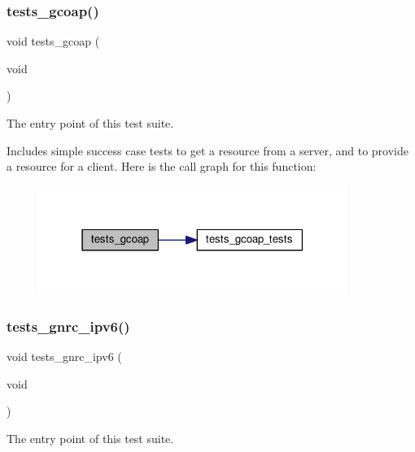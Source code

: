 \subsubsection{\texorpdfstring{tests\+\_\+gcoap()}{tests\_gcoap()}}
{\footnotesize\ttfamily void tests\+\_\+gcoap (\begin{DoxyParamCaption}\item[{void}]{ }\end{DoxyParamCaption})}



The entry point of this test suite. 

Includes simple success case tests to get a resource from a server, and to provide a resource for a client. Here is the call graph for this function\+:
\nopagebreak
\begin{figure}[H]
\begin{center}
\leavevmode
\includegraphics[width=283pt]{group__unittests_gaa26c3c3743ce9c1e363f071dacf5afa0_cgraph}
\end{center}
\end{figure}
\mbox{\label{group__unittests_gaec5ea3d48a03bd5f1f2194f33ce38010}} 
\subsubsection{\texorpdfstring{tests\+\_\+gnrc\+\_\+ipv6()}{tests\_gnrc\_ipv6()}}
{\footnotesize\ttfamily void tests\+\_\+gnrc\+\_\+ipv6 (\begin{DoxyParamCaption}\item[{void}]{ }\end{DoxyParamCaption})}



The entry point of this test suite. 

